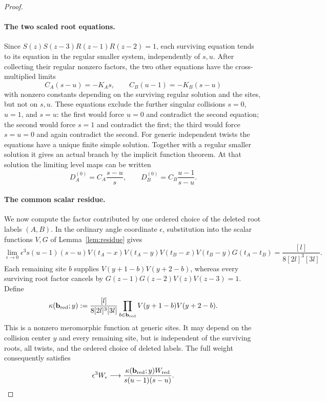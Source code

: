 \begin{proof}
\paragraph{The two scaled root equations.}
Since \(S(z)S(z-3)R(z-1)R(z-2)=1\), each surviving equation tends to its equation in the regular smaller system, independently of \(s,u\). After collecting their regular nonzero factors, the two other equations have the cross-multiplied limits
\[
 C_A(s-u)=-K_A s,\qquad C_B(u-1)=-K_B(s-u)
\]
with nonzero constants depending on the surviving regular solution and the sites, but not on \(s,u\). These equations exclude the further singular collisions \(s=0\), \(u=1\), and \(s=u\): the first would force \(u=0\) and contradict the second equation; the second would force \(s=1\) and contradict the first; the third would force \(s=u=0\) and again contradict the second. For generic independent twists the equations have a unique finite simple solution. Together with a regular smaller solution it gives an actual branch by the implicit function theorem. At that solution the limiting level maps can be written
\[
 D_A^{(0)}=C_A\frac{s-u}{s},\qquad
 D_B^{(0)}=C_B\frac{u-1}{s-u}.
\]

\paragraph{The common scalar residue.}
We now compute the factor contributed by one ordered choice of the deleted root labels \((A,B)\). In the ordinary angle coordinate \(\epsilon\), substitution into the scalar functions \(V,G\) of Lemma~\ref{lem:residue} gives
\[
 \lim_{\epsilon\to0}\epsilon^3s(u-1)(s-u)
 V(t_A-x)V(t_A-y)V(t_B-x)V(t_B-y)G(t_A-t_B)
 =\frac{[l]}{8[2l]^3[3l]}.
\]
Each remaining site \(b\) supplies \(V(y+1-b)V(y+2-b)\), whereas every surviving root factor cancels by
\(G(z-1)G(z-2)V(z)V(z-3)=1\). Define
\[
 \kappa(\mathbf b_{\rm red};y)
 :=\frac{[l]}{8[2l]^3[3l]}
   \prod_{b\in\mathbf b_{\rm red}}V(y+1-b)V(y+2-b).
\]
This is a nonzero meromorphic function at generic sites. It may depend on the collision center \(y\) and every remaining site, but is independent of the surviving roots, all twists, and the ordered choice of deleted labels. The full weight consequently satisfies
\[
 \epsilon^3W_\epsilon\longrightarrow
 \frac{\kappa(\mathbf b_{\rm red};y)W_{\rm red}}
      {s(u-1)(s-u)}.
\]


\end{proof}
